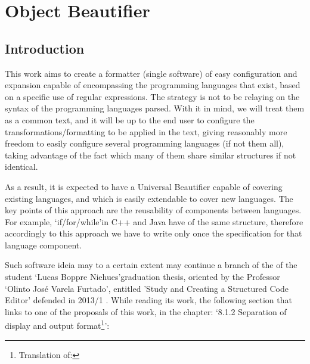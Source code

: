 

%


\chapter{Object Beautifier}\label{sec:software_implementation}


\section{Introduction}

This work aims to create a formatter (single software) of easy configuration
and expansion capable of encompassing the programming languages that exist,
based on a specific use of regular expressions. The strategy is not to be
relaying on the syntax of the programming languages parsed. With it in mind,
we will treat them as a common text, and it will be up to the end user to
configure the transformations/formatting to be applied in the text, giving
reasonably more freedom to easily configure several programming languages
(if not them all), taking advantage of the fact which many of them share
similar structures if not identical.

As a result, it is expected to have a Universal Beautifier capable of
covering existing languages, and which is easily extendable to cover new
languages. The key points of this approach are the reusability of components
between languages. For example, `if/for/while'\s in C++ and Java have of the
same structure, therefore accordingly to this approach we have to write only
once the specification for that language component.

Such software ideia may to a certain extent may continue a branch of the of
the student `Lucas Boppre Niehues'\s graduation thesis, oriented by the
Professor `Olinto José Varela Furtado', entitled 'Study and Creating a
Structured Code Editor' defended in 2013/1 \cite{structuredEditorStudy}.
While reading its work, the following section that links to one of the
proposals of this work, in the chapter: `8.1.2 Separation of display and
output format\footnote{Translation of: }':

